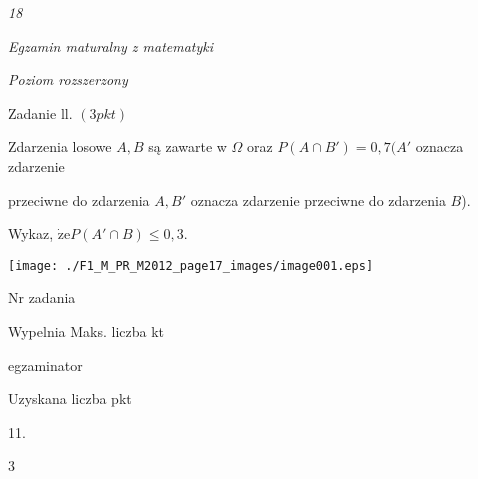 \documentclass[a4paper,12pt]{article}
\begin{document}
{\it 18}

{\it Egzamin maturalny z matematyki}

{\it Poziom rozszerzony}

Zadanie ll. $(3pkt)$

Zdarzenia losowe $A, B$ są zawarte w $\Omega$ oraz $P(A\cap B')=0,7 (A'$ oznacza zdarzenie

przeciwne do zdarzenia $A, B'$ oznacza zdarzenie przeciwne do zdarzenia $B$).

Wykaz, $\dot{\mathrm{z}}\mathrm{e}P(A'\cap B)\leq 0,3.$
\begin{center}
\texttt{[image: ./F1\_M\_PR\_M2012\_page17\_images/image001.eps]}
\end{center}
Nr zadania

Wypelnia Maks. liczba kt

egzaminator

Uzyskana liczba pkt

11.

3
\end{document}
